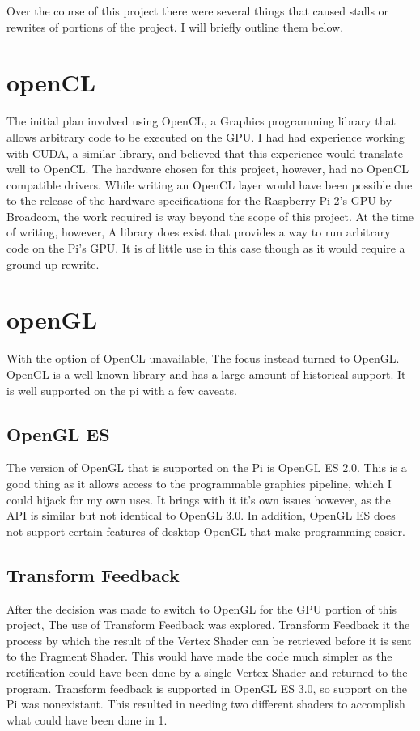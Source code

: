 \thispagestyle{plain}
Over the course of this project there were several things that caused stalls or rewrites of portions of the project.  I will briefly outline them below.

\section{openCL}
The initial plan involved using OpenCL, a Graphics programming library that allows arbitrary code to be executed on the GPU.  I had had experience working with CUDA, a similar library, and believed that this experience would translate well to OpenCL.  The hardware chosen for this project, however, had no OpenCL compatible drivers.  While writing an OpenCL layer would have been possible due to the release of the hardware specifications for the Raspberry Pi 2's GPU by Broadcom, the work required is way beyond the scope of this project.  At the time of writing, however, A library does exist that provides a way to run arbitrary code on the Pi's GPU.  It is of little use in this case though as it would require a ground up rewrite.

\section{openGL}
With the option of OpenCL unavailable, The focus instead turned to OpenGL.  OpenGL is a well known library and has a large amount of historical support.  It is well supported on the pi with a few caveats.
\subsection{OpenGL ES}
The version of OpenGL that is supported on the Pi is OpenGL ES 2.0.  This is a good thing as it allows access to the programmable graphics pipeline, which I could hijack for my own uses.  It brings with it it's own issues however, as the API is similar but not identical to OpenGL 3.0.  In addition, OpenGL ES does not support certain features of desktop OpenGL that make programming easier.
\subsection{Transform Feedback}
After the decision was made to switch to OpenGL for the GPU portion of this project, The use of Transform Feedback was explored.  Transform Feedback it the process by which the result of the Vertex Shader can be retrieved before it is sent to the Fragment Shader.  This would have made the code much simpler as the rectification could have been done by a single Vertex Shader and returned to the program.  Transform feedback is supported in OpenGL ES 3.0, so support on the Pi was nonexistant.  This resulted in needing two different shaders to accomplish what could have been done in 1.
